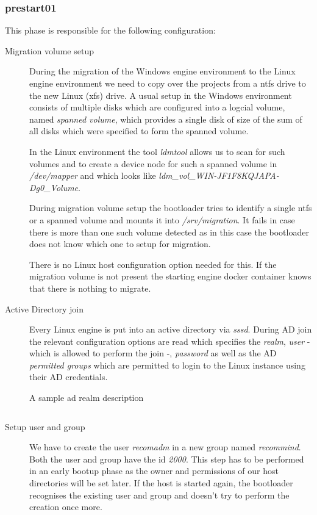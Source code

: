 			\subsubsection{prestart01}
			This phase is responsible for the following configuration:
			\begin{description}
				\item[Migration volume setup] During the migration of the Windows engine environment to the Linux engine environment we need to copy over the projects from a ntfs drive to the new Linux (xfs) drive. A usual setup in the Windows environment consists of multiple disks which are configured into a logcial volume, named \emph{spanned volume}, which provides a single disk of size of the sum of all disks which were specified to form the spanned volume.
			
			In the Linux environment the tool \emph{ldmtool} allows us to scan for such volumes and to create a device node for such a spanned volume in \emph{/dev/mapper} and which looks like \emph{ldm\_vol\_WIN-JF1F8KQJAPA-Dg0\_Volume}.
			
			During migration volume setup the bootloader tries to identify a single ntfs or a spanned volume and mounts it into \emph{/srv/migration}. It fails in case there is more than one such volume detected as in this case the bootloader does not know which one to setup for migration.
			
			There is no Linux host configuration option needed for this. If the migration volume is not present the starting engine docker container knows that there is nothing to migrate.
			
				\item[Active Directory join] Every Linux engine is put into an active directory via \emph{sssd}. During AD join the relevant configuration options are read which specifies the \emph{realm}, \emph{user} - which is allowed to perform the join -, \emph{password} as well as the AD \emph{permitted groups} which are permitted to login to the Linux instance using their AD credentials.
				\begin{listing}[H]
					\caption{A sample ad realm description}
					\label{lst:p01:ch01:linhost_ad_realm_descr}
					\inputminted{yaml}{\relative{chapter_01/section_3.2/ad_realm_description_example.yaml}}
				\end{listing}

				\item[Setup user and group] We have to create the user \emph{recomadm} in a new group named \emph{recommind}. Both the user and group have the id \emph{2000}. This step has to be performed in an early bootup phase as the owner and permissions of our host directories will be set later. If the host is started again, the bootloader recognises the existing user and group and doesn't try to perform the creation once more.
			\end{description}
			
